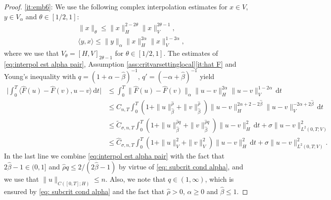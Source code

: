 \documentclass[10pt,a4paper]{amsart}
\newcommand{\dd}{\,\mathrm{d}}
\newcommand{\<}{\langle}
\newcommand{\?}{\rangle}
\theoremstyle{plain}
\begin{document}
\begin{proof}
\ref{it:emb6}:  
We use the following complex interpolation estimates for $x\in V$, $y\in V_\alpha$ and $\theta\in[1/2,1]$:  
\begin{equation}\label{eq:interpol est alpha pair}
\begin{split}
&\|x\|_{\theta}\leq \|x\|_H^{2-2\theta}\|x\|_V^{2\theta-1}, \\   
&\<y,x\? \leq   \|y\|_{\alpha}\|x\|_{H}^{2\alpha}\|x\|_V^{1-2\alpha}, 
\end{split}
\end{equation}
where we use that $V_\theta=[H,V]_{2\theta-1}$ for $\theta\in[1/2,1]$. 
The   estimates of \eqref{eq:interpol est alpha pair}, Assumption \ref{ass:critvarsettinglocal}\ref{it:hat F} and Young's inequality  with $q= (1+\alpha-\hat{\beta})^{-1}$, $q'= (-\alpha+\hat{\beta})^{-1}$ yield
  \begin{align*} 
   \Big|\int_0^T\<\hat{F}(u)-\hat{F}(v),u-v\?\dd t    \Big|
  &\leq   \int_0^T \|\hat{F}(u)-\hat{F}(v)\|_\alpha\|u-v\|_H^{2\alpha}\|u-v\|_V^{1-2\alpha} \dd t \\
  &\leq  {C}_{n,T} \int_0^T  (1+\|u\|_{\hat{\beta}}^{\hat{\rho}}+ \|v\|_{\hat{\beta}}^{\hat{\rho}})\|u-v\|_H^{2\alpha+2-2\hat{\beta}}\|u-v\|_V^{-2\alpha+2\hat{\beta}} \dd t \\
  &\leq  \tilde{C}_{\sigma,n,T} \int_0^T  (1+\|u\|_{\hat{\beta}}^{\hat{\rho}q}+ \|v\|_{\hat{\beta}}^{\hat{\rho}q}) \|u-v\|_H^{2} \dd t +\sigma\|u-v\|_{L^2(0,T;V)}^2 \\
   &\leq \hat{C}_{\sigma,n,T} \int_0^T  (1+\|u\|_V^2+ \|v\|_V^2)\|u-v\|_H^2\dd t+\sigma\|u-v\|_{L^2(0,T;V)}^2. 
  \end{align*} 
 In the last line we  combine \eqref{eq:interpol est alpha pair} with the fact that $2\hat{\beta}-1\in(0,1]$ and 
$\hat{\rho}q\leq  {2}/({2\hat{\beta}-1})$ by virtue of  \eqref{eq: subcrit cond alpha}, and we use that    $\|u\|_{C([0,T];H)}\leq n$. Also, we note that $q\in(1,\infty)$, which is ensured by  \eqref{eq: subcrit cond alpha} and the fact that $\hat{\rho}>0$, $\alpha\geq 0$ and $\hat{\beta}\leq 1$. 
\end{proof}
\end{document}
